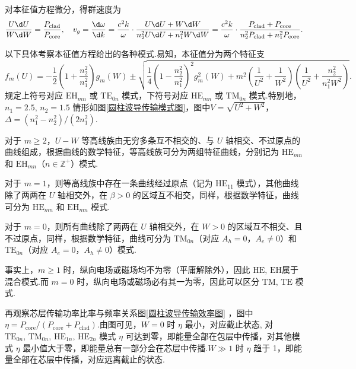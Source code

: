 对本征值方程微分，得群速度为
\begin{equation*}
	\dfrac{U \d U}{W \d W} = \dfrac{P_{\text{clad}}}{P_{\text{core}}}, \quad v_g = \dfrac{\d \omega}{\d k} = \dfrac{c^2 k}{\omega} \cdot \dfrac{U \d U + W \d W}{n_2^2 U \d U + n_1^2 W \d W} = \dfrac{c^2 k}{\omega} \cdot \dfrac{P_{\text{clad}} + P_{\text{core}}}{n_2^2 P_{\text{clad}} + n_1^2 P_{\text{core}}}.
\end{equation*}

以下具体考察本征值方程给出的各种模式.易知，本征值分为两个特征支
\begin{equation*}
	f_m(U) = -\dfrac{1}{2} \left( 1 + \dfrac{n_2^2}{n_1^2} \right) g_m(W) \pm \sqrt{\dfrac{1}{4} \left( 1 - \dfrac{n_2^2}{n_1^2} \right)^2 g_m^2(W) + m^2 \left( \dfrac{1}{U^2} + \dfrac{1}{W^2} \right) \left( \dfrac{1}{U^2} + \dfrac{n_2^2}{n_1^2 W^2} \right)}.
\end{equation*}
规定上符号对应 \(\mathrm{EH}_{mn}\) 或 \(\mathrm{TE}_{0n}\) 模式，下符号对应 \(\mathrm{HE}_{mn}\) 或 \(\mathrm{TM}_{0n}\) 模式.特别地，\(n_1 = 2.5,\,n_2 = 1.5\) 情形如图\ref{圆柱波导传输模式图}，图中\(V = \sqrt{U^2 + W^2}\)，\(\Delta = (n_1^2 - n_2^2)/(2 n_1^2)\).

对于 \(m \geq 2\)，\(U-W\) 等高线族由无穷多条互不相交的、与 \(U\) 轴相交、不过原点的曲线组成，根据曲线的数学特征，等高线族可分为两组特征曲线，分别记为 \(\mathrm{HE}_{mn}\) 和 \(\mathrm{EH}_{mn}\)（\(n \in \mathbb{Z}^+\)）模式.

对于 \(m = 1\)，则等高线族中存在一条曲线经过原点（记为 \(\mathrm{HE}_{11}\) 模式），其他曲线除了两两在 \(U\) 轴相交外，在 \(\beta > 0\) 的区域互不相交，同样，根据数学特征，曲线可分为 \(\mathrm{HE}_{mn}\) 和 \(\mathrm{EH}_{mn}\) 模式.

对于 \(m = 0\)，则所有曲线除了两两在 \(U\) 轴相交外，在 \(W > 0\) 的区域互不相交、且不过原点，同样，根据数学特征，曲线可分为 \(\mathrm{TM}_{0n}\)（对应 \(A_h = 0\)，\(A_e \neq 0\)）和 \(\mathrm{TE}_{0n}\)（对应 \(A_e = 0\)，\(A_h \neq 0\)）模式.

事实上，\(m \geq 1\) 时，纵向电场或磁场均不为零（平庸解除外），因此 \(\mathrm{HE},\,\mathrm{EH}\)属于混合模式.而 \(m = 0\) 时，纵向电场或磁场必有其一为零，因此可以区分 \(\mathrm{TM},\,\mathrm{TE}\) 模式.

再观察芯层传输功率比率与频率关系图\ref{圆柱波导传输效率图} ，图中 \(\eta =P_{\text{core}}/(P_{\text{core}} + P_{\text{clad}})\).由图可见，\(W = 0\) 时 \(\eta\) 最小，对应截止状态, 对 \(\mathrm{TE}_{0n},\,\mathrm{TM}_{0n},\,\mathrm{HE}_{1n},\,\mathrm{HE}_{2n}\) 模式 \(\eta\) 可达到零，即能量全部在包层中传播，对其他模式 \(\eta\) 最小值大于零，即能量总有一部分会在芯层中传播.\(W \gg 1\) 时 \(\eta\) 趋于 1，即能量全部在芯层中传播，对应远离截止的状态.

